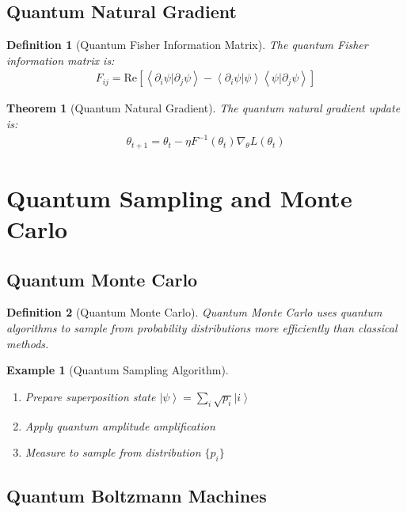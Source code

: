 \documentclass[11pt]{article}
\newtheorem{definition}{Definition}[section]
\newtheorem{theorem}{Theorem}[section]
\newtheorem{example}{Example}[section]
\newcommand{\ket}[1]{\left|#1\right\rangle}
\newcommand{\braket}[2]{\left\langle#1|#2\right\rangle}
\begin{document}
\subsection{Quantum Natural Gradient}

\begin{definition}[Quantum Fisher Information Matrix]
The quantum Fisher information matrix is:
\begin{align}
F_{ij} = \text{Re}[\braket{\partial_i \psi}{\partial_j \psi} - \braket{\partial_i \psi}{\psi}\braket{\psi}{\partial_j \psi}]
\end{align}
\end{definition}

\begin{theorem}[Quantum Natural Gradient]
The quantum natural gradient update is:
\begin{align}
\theta_{t+1} = \theta_t - \eta F^{-1}(\theta_t) \nabla_\theta L(\theta_t)
\end{align}
\end{theorem}

\section{Quantum Sampling and Monte Carlo}

\subsection{Quantum Monte Carlo}

\begin{definition}[Quantum Monte Carlo]
Quantum Monte Carlo uses quantum algorithms to sample from probability distributions more efficiently than classical methods.
\end{definition}

\begin{example}[Quantum Sampling Algorithm]
\begin{enumerate}
    \item Prepare superposition state $\ket{\psi} = \sum_i \sqrt{p_i} \ket{i}$
    \item Apply quantum amplitude amplification
    \item Measure to sample from distribution $\{p_i\}$
\end{enumerate}
\end{example}

\subsection{Quantum Boltzmann Machines}
\end{document}
